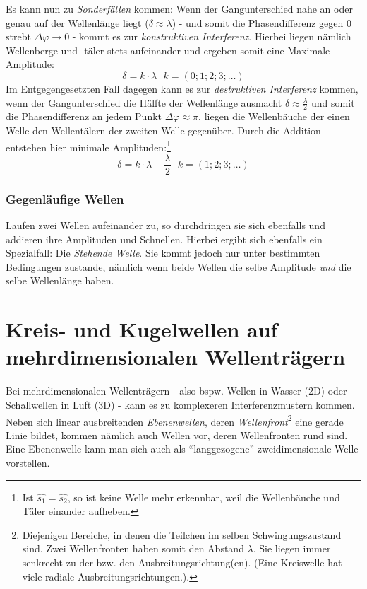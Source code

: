 Es kann nun zu \emph{Sonderfällen} kommen: Wenn der Gangunterschied nahe an oder genau auf der Wellenlänge liegt (\(\delta \approx \lambda\)) - und somit die Phasendifferenz gegen \(0\) strebt \(\Delta \varphi \rightarrow 0\) - kommt es zur \emph{konstruktiven Interferenz}. Hierbei liegen nämlich Wellenberge und -täler stets aufeinander und ergeben somit eine Maximale Amplitude:
\begin{equation}
 	\delta = k \cdot \lambda ~~~ k = (0; 1; 2; 3; \ldots)
 		\label{eq_bedingungen_konstruktiveinterferenz}
\end{equation}
Im Entgegengesetzten Fall dagegen kann es zur \emph{destruktiven Interferenz} kommen, wenn der Gangunterschied die Hälfte der Wellenlänge ausmacht \(\delta \approx \frac{\lambda}{2}\) und somit die Phasendifferenz an jedem Punkt \(\Delta \varphi \approx \pi\), liegen die Wellenbäuche der einen Welle den Wellentälern der zweiten Welle gegenüber. Durch die Addition entstehen hier minimale Amplituden:\footnote{Ist \(\hat{s_1} = \hat{s_2}\), so ist keine Welle mehr erkennbar, weil die Wellenbäuche und Täler einander aufheben.}
\begin{equation}
 	\delta = k \cdot \lambda - \frac{\lambda}{2} ~~~ k = (1; 2; 3; \ldots)
 		\label{eq_bedingungen_destruktiveinterferenz}
\end{equation}


\subsubsection{Gegenläufige Wellen}

Laufen zwei Wellen aufeinander zu, so durchdringen sie sich ebenfalls und addieren ihre Amplituden und Schnellen. Hierbei ergibt sich ebenfalls ein Spezialfall: Die \emph{Stehende Welle}. Sie kommt jedoch nur unter bestimmten Bedingungen zustande, nämlich wenn beide Wellen die selbe Amplitude \emph{und} die selbe Wellenlänge haben.



		\section{Kreis- und Kugelwellen auf mehrdimensionalen Wellenträgern}

Bei mehrdimensionalen Wellenträgern - also bspw. Wellen in Wasser (2D) oder Schallwellen in Luft (3D) - kann es zu komplexeren Interferenzmustern kommen. Neben sich linear ausbreitenden \emph{Ebenenwellen}, deren \emph{Wellenfront}\footnote{Diejenigen Bereiche, in denen die Teilchen im selben Schwingungszustand sind. Zwei Wellenfronten haben somit den Abstand \(\lambda\). Sie liegen immer senkrecht zu der bzw. den Ausbreitungsrichtung(en). (Eine Kreiswelle hat viele radiale Ausbreitungsrichtungen.).} eine gerade Linie bildet, kommen nämlich auch Wellen vor, deren Wellenfronten rund sind. Eine Ebenenwelle kann man sich auch als "`langgezogene"' zweidimensionale Welle vorstellen.
 
